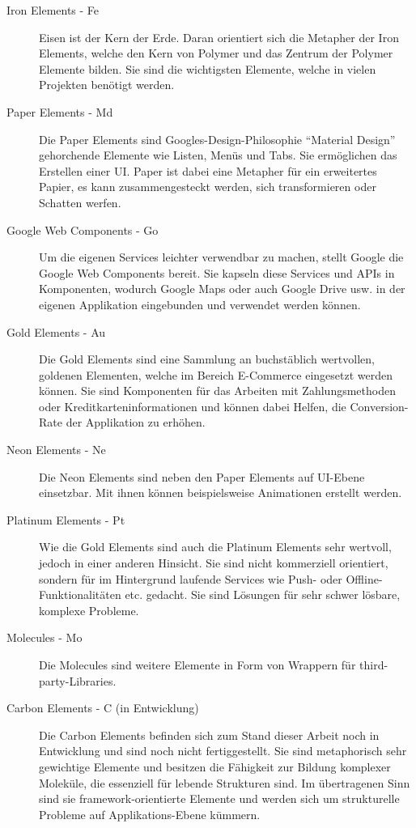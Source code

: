 \begin{description}
  \item[Iron Elements - Fe] Eisen ist der Kern der Erde. Daran orientiert sich die Metapher der Iron Elements, welche den Kern von Polymer und das Zentrum der Polymer Elemente bilden. Sie sind die wichtigsten Elemente, welche in vielen Projekten benötigt werden.
  \item[Paper Elements - Md] Die Paper Elements sind Googles-Design-Philosophie ``Material Design'' gehorchende Elemente wie Listen, Menüs und Tabs. Sie ermöglichen das Erstellen einer \ac{UI}. Paper ist dabei eine Metapher für ein erweitertes Papier, es kann zusammengesteckt werden, sich transformieren oder Schatten werfen.
  \item[Google Web Components - Go] Um die eigenen Services leichter verwendbar zu machen, stellt Google die Google Web Components bereit. Sie kapseln diese Services und \ac{API}s in Komponenten, wodurch Google Maps oder auch Google Drive usw. in der eigenen Applikation eingebunden und verwendet werden können.
  \item[Gold Elements - Au] Die Gold Elements sind eine Sammlung an buchstäblich wertvollen, goldenen Elementen, welche im Bereich E-Commerce eingesetzt werden können. Sie sind Komponenten für das Arbeiten mit Zahlungsmethoden oder Kreditkarteninformationen und können dabei Helfen, die Conversion-Rate der Applikation zu erhöhen.
  \item[Neon Elements - Ne] Die Neon Elements sind neben den Paper Elements auf \ac{UI}-Ebene einsetzbar. Mit ihnen können beispielsweise Animationen erstellt werden.
  \item[Platinum Elements - Pt] Wie die Gold Elements sind auch die Platinum Elements sehr wertvoll, jedoch in einer anderen Hinsicht. Sie sind nicht kommerziell orientiert, sondern für im Hintergrund laufende Services wie Push- oder Offline-Funk\-tio\-na\-li\-tä\-ten etc. gedacht. Sie sind Lösungen für sehr schwer lösbare, komplexe Probleme.
  \item[Molecules - Mo] Die Molecules sind weitere Elemente in Form von Wrappern für third-party-Lib\-rar\-ies.
  \item[Carbon Elements - C (in Entwicklung)] Die Carbon Elements befinden sich zum Stand dieser Arbeit noch in Entwicklung und sind noch nicht fertiggestellt. Sie sind metaphorisch sehr gewichtige Elemente und besitzen die Fähigkeit zur Bildung komplexer Moleküle, die essenziell für lebende Strukturen sind. Im übertragenen Sinn sind sie framework-orientierte Elemente und werden sich um strukturelle Probleme auf Applikations-Ebene kümmern.
\end{description}


